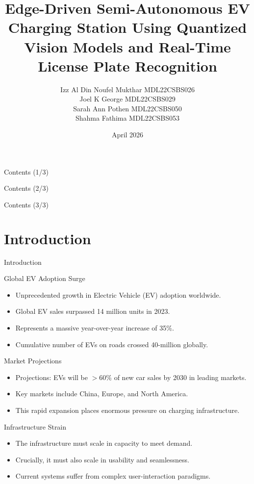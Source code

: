 \documentclass{beamer}
\title[EV Charging Station]{Edge-Driven Semi-Autonomous EV Charging Station Using Quantized Vision Models and Real-Time License Plate Recognition}
\author{
  Izz Al Din Noufel Mukthar \quad MDL22CSBS026\\
  Joel K George \quad MDL22CSBS029\\
  Sarah Ann Pothen \quad MDL22CSBS050\\
  Shahma Fathima \quad MDL22CSBS053
}
\institute{Department of Computer Engineering\\Model Engineering College}
\date{April 2026}
\begin{document}
\begin{frame}
    \titlepage
\end{frame}

\begin{frame}{Contents (1/3)}
  \tableofcontents[sections={1-4}]
\end{frame}

\begin{frame}{Contents (2/3)}
  \tableofcontents[sections={5-9}]
\end{frame}

\begin{frame}{Contents (3/3)}
  \tableofcontents[sections={10-14}]
\end{frame}

\section{Introduction}

\begin{frame}
    \centering
    \Huge Introduction
\end{frame}

\begin{frame}{Global EV Adoption Surge}
\begin{itemize}
    \item Unprecedented growth in Electric Vehicle (EV) adoption worldwide.
    \item Global EV sales surpassed 14 million units in 2023.
    \item Represents a massive year-over-year increase of 35\%.
    \item Cumulative number of EVs on roads crossed 40-million globally.
\end{itemize}
\end{frame}

\begin{frame}{Market Projections}
\begin{itemize}
    \item Projections: EVs will be $>60\%$ of new car sales by 2030 in leading markets.
    \item Key markets include China, Europe, and North America.
    \item This rapid expansion places enormous pressure on charging infrastructure.
\end{itemize}
\end{frame}

\begin{frame}{Infrastructure Strain}
\begin{itemize}
    \item The infrastructure must scale in capacity to meet demand.
    \item Crucially, it must also scale in usability and seamlessness.
    \item Current systems suffer from complex user-interaction paradigms.
\end{itemize}
\end{frame}
\end{document}

